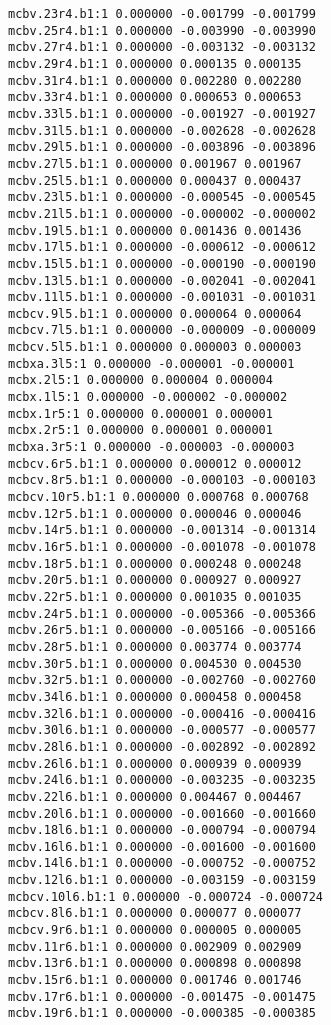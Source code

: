 \begin{verbatim}
mcbv.23r4.b1:1 0.000000 -0.001799 -0.001799
mcbv.25r4.b1:1 0.000000 -0.003990 -0.003990
mcbv.27r4.b1:1 0.000000 -0.003132 -0.003132
mcbv.29r4.b1:1 0.000000 0.000135 0.000135
mcbv.31r4.b1:1 0.000000 0.002280 0.002280
mcbv.33r4.b1:1 0.000000 0.000653 0.000653
mcbv.33l5.b1:1 0.000000 -0.001927 -0.001927
mcbv.31l5.b1:1 0.000000 -0.002628 -0.002628
mcbv.29l5.b1:1 0.000000 -0.003896 -0.003896
mcbv.27l5.b1:1 0.000000 0.001967 0.001967
mcbv.25l5.b1:1 0.000000 0.000437 0.000437
mcbv.23l5.b1:1 0.000000 -0.000545 -0.000545
mcbv.21l5.b1:1 0.000000 -0.000002 -0.000002
mcbv.19l5.b1:1 0.000000 0.001436 0.001436
mcbv.17l5.b1:1 0.000000 -0.000612 -0.000612
mcbv.15l5.b1:1 0.000000 -0.000190 -0.000190
mcbv.13l5.b1:1 0.000000 -0.002041 -0.002041
mcbv.11l5.b1:1 0.000000 -0.001031 -0.001031
mcbcv.9l5.b1:1 0.000000 0.000064 0.000064
mcbcv.7l5.b1:1 0.000000 -0.000009 -0.000009
mcbcv.5l5.b1:1 0.000000 0.000003 0.000003
mcbxa.3l5:1 0.000000 -0.000001 -0.000001
mcbx.2l5:1 0.000000 0.000004 0.000004
mcbx.1l5:1 0.000000 -0.000002 -0.000002
mcbx.1r5:1 0.000000 0.000001 0.000001
mcbx.2r5:1 0.000000 0.000001 0.000001
mcbxa.3r5:1 0.000000 -0.000003 -0.000003
mcbcv.6r5.b1:1 0.000000 0.000012 0.000012
mcbcv.8r5.b1:1 0.000000 -0.000103 -0.000103
mcbcv.10r5.b1:1 0.000000 0.000768 0.000768
mcbv.12r5.b1:1 0.000000 0.000046 0.000046
mcbv.14r5.b1:1 0.000000 -0.001314 -0.001314
mcbv.16r5.b1:1 0.000000 -0.001078 -0.001078
mcbv.18r5.b1:1 0.000000 0.000248 0.000248
mcbv.20r5.b1:1 0.000000 0.000927 0.000927
mcbv.22r5.b1:1 0.000000 0.001035 0.001035
mcbv.24r5.b1:1 0.000000 -0.005366 -0.005366
mcbv.26r5.b1:1 0.000000 -0.005166 -0.005166
mcbv.28r5.b1:1 0.000000 0.003774 0.003774
mcbv.30r5.b1:1 0.000000 0.004530 0.004530
mcbv.32r5.b1:1 0.000000 -0.002760 -0.002760
mcbv.34l6.b1:1 0.000000 0.000458 0.000458
mcbv.32l6.b1:1 0.000000 -0.000416 -0.000416
mcbv.30l6.b1:1 0.000000 -0.000577 -0.000577
mcbv.28l6.b1:1 0.000000 -0.002892 -0.002892
mcbv.26l6.b1:1 0.000000 0.000939 0.000939
mcbv.24l6.b1:1 0.000000 -0.003235 -0.003235
mcbv.22l6.b1:1 0.000000 0.004467 0.004467
mcbv.20l6.b1:1 0.000000 -0.001660 -0.001660
mcbv.18l6.b1:1 0.000000 -0.000794 -0.000794
mcbv.16l6.b1:1 0.000000 -0.001600 -0.001600
mcbv.14l6.b1:1 0.000000 -0.000752 -0.000752
mcbv.12l6.b1:1 0.000000 -0.003159 -0.003159
mcbcv.10l6.b1:1 0.000000 -0.000724 -0.000724
mcbcv.8l6.b1:1 0.000000 0.000077 0.000077
mcbcv.9r6.b1:1 0.000000 0.000005 0.000005
mcbv.11r6.b1:1 0.000000 0.002909 0.002909
mcbv.13r6.b1:1 0.000000 0.000898 0.000898
mcbv.15r6.b1:1 0.000000 0.001746 0.001746
mcbv.17r6.b1:1 0.000000 -0.001475 -0.001475
mcbv.19r6.b1:1 0.000000 -0.000385 -0.000385

\end{verbatim}
